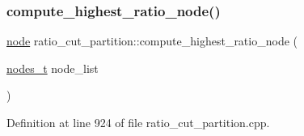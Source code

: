 \subsubsection{\texorpdfstring{compute\+\_\+highest\+\_\+ratio\+\_\+node()}{compute\_highest\_ratio\_node()}}
{\footnotesize\ttfamily \mbox{\hyperlink{classnode}{node}} ratio\+\_\+cut\+\_\+partition\+::compute\+\_\+highest\+\_\+ratio\+\_\+node (\begin{DoxyParamCaption}\item[{\mbox{\hyperlink{edge_8h_a22ac17689106ba21a84e7bc54d1199d6}{nodes\+\_\+t}}}]{node\+\_\+list }\end{DoxyParamCaption})\hspace{0.3cm}{\ttfamily [protected]}}



Definition at line 924 of file ratio\+\_\+cut\+\_\+partition.\+cpp.


